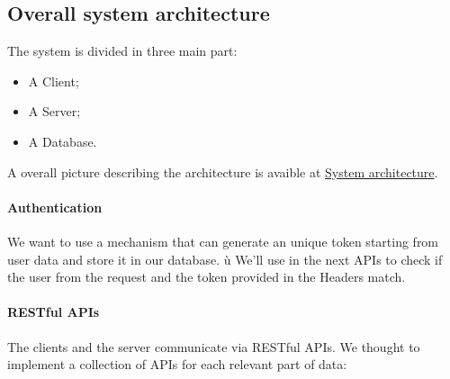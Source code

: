 \documentclass[../../main]{subfiles}
\begin{document}
\label{ss:overall-system-architecture}
\subsection{Overall system architecture}
The system is divided in three main part:
    \begin{itemize}
        \item A Client;
        \item A Server;
        \item A Database.
    \end{itemize}

A overall picture describing the architecture is avaible at \hyperref[fig:system_architecture]{System architecture}.

\paragraph*{Authentication}
We want to use a mechanism that can generate an unique token starting from user data and store it in our database. ù
We'll use in the next APIs to check if the user from the request and the token provided in the Headers match.

\paragraph*{RESTful APIs}
The clients and the server communicate via RESTful APIs. We thought to implement a collection of APIs for each relevant part of data:
\end{document}
